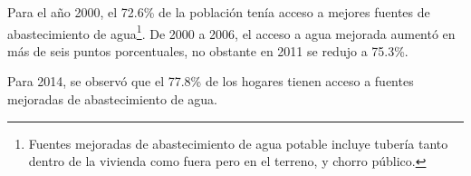  Para el año 2000, el 72.6\% de la población tenía acceso a mejores fuentes de abastecimiento de agua\footnote{Fuentes mejoradas de abastecimiento de agua potable incluye tubería tanto  dentro de la vivienda como  fuera pero en el terreno, y chorro público.}. De 2000 a 2006, el acceso a agua mejorada aumentó en  más de seis puntos porcentuales, no obstante en 2011 se redujo a 75.3\%. 

Para 2014, se observó que el 77.8\% de los hogares tienen acceso a fuentes mejoradas de abastecimiento de agua.